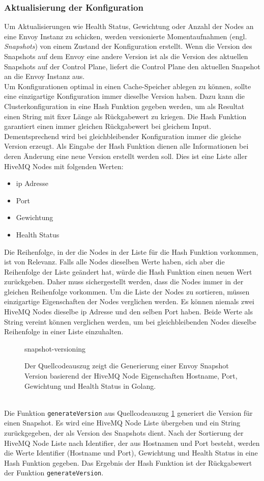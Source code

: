 \subsubsection{Aktualisierung der Konfiguration}
Um Aktualisierungen wie Health Status, Gewichtung oder Anzahl der Nodes an eine Envoy Instanz zu schicken, werden versionierte Momentaufnahmen (engl. \textit{Snapshots}) von einem Zustand der Konfiguration erstellt. Wenn die Version des Snapshots auf dem Envoy eine andere Version ist als die Version des aktuellen Snapshots auf der Control Plane, liefert die Control Plane den aktuellen Snapshot an die Envoy Instanz aus.
\\
Um Konfigurationen optimal in einen Cache-Speicher ablegen zu können, sollte eine einzigartige Konfiguration immer dieselbe Version haben.
Dazu kann die Clusterkonfiguration in eine Hash Funktion gegeben werden, um als Resultat einen String mit fixer Länge als Rückgabewert zu kriegen. Die Hash Funktion garantiert einen immer gleichen Rückgabewert bei gleichem Input. Dementsprechend wird bei gleichbleibender Konfiguration immer die gleiche Version erzeugt.
Als Eingabe der Hash Funktion dienen alle Informationen bei deren Änderung eine neue Version erstellt werden soll. Dies ist eine Liste aller HiveMQ Nodes mit folgenden Werten:
\begin{itemize}
  \item \ac{ip} Adresse
  \item Port
  \item Gewichtung
  \item Health Status
\end{itemize}
Die Reihenfolge, in der die Nodes in der Liste für die Hash Funktion vorkommen, ist von Relevanz. Falls alle Nodes dieselben Werte haben, sich aber die Reihenfolge der Liste geändert hat, würde die Hash Funktion einen neuen Wert zurückgeben. Daher muss sichergestellt werden, dass die Nodes immer in der gleichen Reihenfolge vorkommen. Um die Liste der Nodes zu sortieren, müssen einzigartige Eigenschaften der Nodes verglichen werden.
Es können niemals zwei HiveMQ Nodes dieselbe \ac{ip} Adresse und den selben Port haben. Beide Werte als String vereint können verglichen werden, um bei gleichbleibenden Nodes dieselbe Reihenfolge in einer Liste einzuhalten.
\begin{figure}
    {snapshot-versioning}
    \caption{Der Quellcodeauszug zeigt die Generierung einer Envoy Snapshot Version basierend der HiveMQ Node Eigenschaften Hostname, Port, Gewichtung und Health Status in Golang.}
    \label{code:snapshot-versioning}
\end{figure}
\\
Die Funktion \verb|generateVersion| aus Quellcodeauszug \ref{code:snapshot-versioning} generiert die Version für einen Snapshot. Es wird eine HiveMQ Node Liste übergeben und ein String zurückgegeben, der als Version des Snapshots dient. Nach der Sortierung der HiveMQ Node Liste nach Identifier, der aus Hostnamen und Port besteht, werden die Werte Identifier (Hostname und Port), Gewichtung und Health Status in eine Hash Funktion gegeben. Das Ergebnis der Hash Funktion ist der Rückgabewert der Funktion \verb|generateVersion|.

